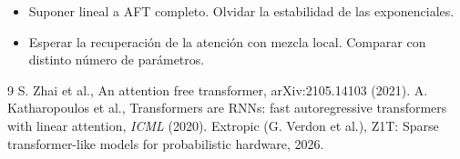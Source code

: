 \documentclass[11pt,a4paper]{article}
\begin{document}
\begin{error}
\begin{itemize}[nosep]
\item Suponer lineal a AFT completo. \quad Olvidar la estabilidad de las exponenciales.
\item Esperar la recuperación de la atención con mezcla local. \quad Comparar con distinto número de parámetros.
\end{itemize}
\end{error}

\begin{thebibliography}{9}\small
{} S. Zhai et al., An attention free transformer, arXiv:2105.14103 (2021).
 A. Katharopoulos et al., Transformers are RNNs: fast autoregressive transformers with linear attention, \emph{ICML} (2020).
 Extropic (G. Verdon et al.), Z1T: Sparse transformer-like models for probabilistic hardware, 2026.
\end{thebibliography}
\end{document}
